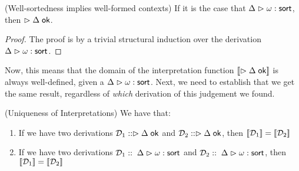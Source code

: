 \begin{lemma}{(Well-sortedness implies well-formed contexts)}
If it is the case that ${{\Delta}} \vartriangleright {{\omega}} : {\mathsf{sort}}$, then $\vartriangleright {\Delta} \;\mathsf{ok}$.
\end{lemma}
\begin{proof}
The proof is by a trivial structural induction over the derivation ${{\Delta}} \vartriangleright {{\omega}} : {\mathsf{sort}}$. 
\end{proof}

Now, this means that the domain of the interpretation function
$[\![{\vartriangleright {\Delta} \;\mathsf{ok}}]\!]$ is always well-defined, given a ${{\Delta}} \vartriangleright {{\omega}} : {\mathsf{sort}}$. Next,
we need to establish that we get the same result, regardless of \emph{which} derivation
of this judgement we found. 

\begin{lemma}{(Uniqueness of Interpretations)}
We have that:
\begin{enumerate}
\item If we have two derivations $\mathcal{D}_1 :: \vartriangleright {\Delta} \;\mathsf{ok}$
      and $\mathcal{D}_2 :: \vartriangleright {\Delta} \;\mathsf{ok}$, 
      then $[\![{\mathcal{D}_1}]\!] = [\![{\mathcal{D}_2}]\!]$
\item If we have two derivations $\mathcal{D}_1 ::\; {{\Delta}} \vartriangleright {{\omega}} : {\mathsf{sort}}$
      and $\mathcal{D}_2 ::\; {{\Delta}} \vartriangleright {{\omega}} : {\mathsf{sort}}$, 
      then $[\![{\mathcal{D}_1}]\!] = [\![{\mathcal{D}_2}]\!]$
\end{enumerate}
\end{lemma}

